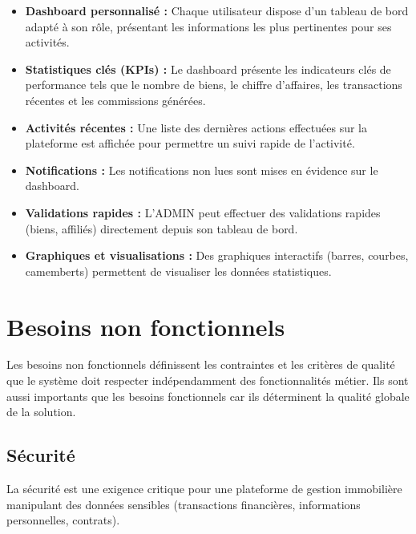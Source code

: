 \documentclass[a4paper,12pt]{report}
\begin{document}
\begin{itemize}
    \item \textbf{Dashboard personnalisé :} Chaque utilisateur dispose d'un tableau de bord adapté à son rôle, présentant les informations les plus pertinentes pour ses activités.
    \item \textbf{Statistiques clés (KPIs) :} Le dashboard présente les indicateurs clés de performance tels que le nombre de biens, le chiffre d'affaires, les transactions récentes et les commissions générées.
    \item \textbf{Activités récentes :} Une liste des dernières actions effectuées sur la plateforme est affichée pour permettre un suivi rapide de l'activité.
    \item \textbf{Notifications :} Les notifications non lues sont mises en évidence sur le dashboard.
    \item \textbf{Validations rapides :} L'ADMIN peut effectuer des validations rapides (biens, affiliés) directement depuis son tableau de bord.
    \item \textbf{Graphiques et visualisations :} Des graphiques interactifs (barres, courbes, camemberts) permettent de visualiser les données statistiques.
\end{itemize}


\section{Besoins non fonctionnels}

Les besoins non fonctionnels définissent les contraintes et les critères de qualité que le système doit respecter indépendamment des fonctionnalités métier. Ils sont aussi importants que les besoins fonctionnels car ils déterminent la qualité globale de la solution.

\subsection{Sécurité}

La sécurité est une exigence critique pour une plateforme de gestion immobilière manipulant des données sensibles (transactions financières, informations personnelles, contrats).
\end{document}
